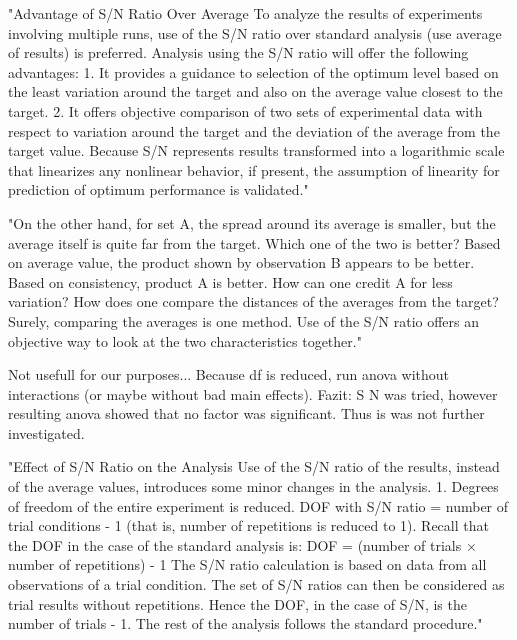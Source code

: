 "Advantage of S/N Ratio Over Average To analyze the results of experiments involving multiple runs, use of the S/N ratio over standard analysis (use average of results) is preferred. Analysis using the S/N ratio will offer the following advantages: 1. It provides a guidance to selection of the optimum level based on the least variation around the target and also on the average value closest to the target. 2. It offers objective comparison of two sets of experimental data with respect to variation around the target and the deviation of the average from the target value. Because S/N represents results transformed into a logarithmic scale that linearizes any nonlinear behavior, if present, the assumption of linearity for prediction of optimum performance is validated."\cite{roy_primer_1990}


"On the other hand, for set A, the spread around its average is smaller, but the average itself is quite far from the target. Which one of the two is better? Based on average value, the product shown by observation B appears to be better. Based on consistency, product A is better. How can one credit A for less variation? How does one compare the distances of the averages from the target? Surely, comparing the averages is one method. Use of the S/N ratio offers an objective way to look at the two characteristics together."\cite{roy_primer_1990}



Not usefull for our purposes... Because df is reduced, run anova without interactions (or maybe without bad main effects). Fazit: S N was tried, however resulting anova showed that no factor was significant. Thus is was not further investigated.

"Effect of S/N Ratio on the Analysis Use of the S/N ratio of the results, instead of the average values, introduces some minor changes in the analysis. 
1. Degrees of freedom of the entire experiment is reduced. DOF with S/N ratio = number of trial conditions - 1 (that is, number of repetitions is reduced to 1). 
Recall that the DOF in the case of the standard analysis is: DOF = (number of trials × number of repetitions) - 1 The S/N ratio calculation is based on data from all observations of a trial condition. 
The set of S/N ratios can then be considered as trial results without repetitions.
Hence the DOF, in the case of S/N, is the number of trials - 1. 
The rest of the analysis follows the standard procedure."\cite{roy_primer_1990}


